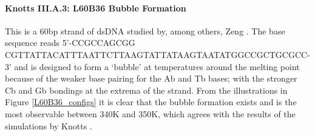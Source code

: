 \paragraph{Knotts III.A.3: L60B36 Bubble Formation} This is a 60bp strand of dsDNA studied by, among others, Zeng \etal \cite{zeng2003length}.
The base sequence reads 5'-CCGCCAGCGG CGTTATTACATTTAATTCTTAAGTATTATAAGTAATATGGCCGCTGCGCC-3' and is designed to form a `bubble' at temperatures around the melting point because of the weaker base pairing for the Ab and Tb bases; with the stronger Cb and Gb bondings at the extrema of the strand.
From the illustrations in Figure \ref{L60B36_configs} it is clear that the bubble formation exists and is the most observable between 340K and 350K, which agrees with the results of the simulations by Knotts \etal \cite{knotts2007coarse}.








